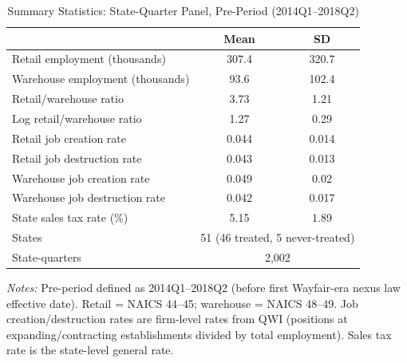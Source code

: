 \begin{table}[t]
\centering
\caption{Summary Statistics: State-Quarter Panel, Pre-Period (2014Q1--2018Q2)}
\label{tab:summary}
\begin{tabular}{lcc}
\hline\hline
& Mean & SD \\
\hline
Retail employment (thousands) & 307.4 & 320.7 \\
Warehouse employment (thousands) & 93.6 & 102.4 \\
Retail/warehouse ratio & 3.73 & 1.21 \\
Log retail/warehouse ratio & 1.27 & 0.29 \\
Retail job creation rate & 0.044 & 0.014 \\
Retail job destruction rate & 0.043 & 0.013 \\
Warehouse job creation rate & 0.049 & 0.02 \\
Warehouse job destruction rate & 0.042 & 0.017 \\
State sales tax rate (\%) & 5.15 & 1.89 \\
\hline
States & \multicolumn{2}{c}{51 (46 treated, 5 never-treated)} \\
State-quarters & \multicolumn{2}{c}{2,002} \\
\hline\hline
\end{tabular}
\begin{tablenotes}
\small
\item \textit{Notes:} Pre-period defined as 2014Q1--2018Q2 (before first Wayfair-era nexus law effective date). Retail = NAICS 44--45; warehouse = NAICS 48--49. Job creation/destruction rates are firm-level rates from QWI (positions at expanding/contracting establishments divided by total employment). Sales tax rate is the state-level general rate.
\end{tablenotes}
\end{table}
